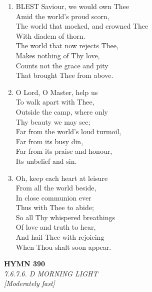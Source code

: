 \begin{enumerate}
    \item BLEST Saviour, we would own Thee \\
        Amid the world's proud scorn, \\
        The world that mocked, and crowned Thee \\
        With diadem of thorn. \\
        The world that now rejects Thee, \\
        Makes nothing of Thy love, \\
        Counts not the grace and pity \\
        That brought Thee from above.

    \item O Lord, O Master, help us \\
        To walk apart with Thee, \\
        Outside the camp, where only \\
        Thy beauty we may see; \\
        Far from the world's loud turmoil, \\
        Far from its busy din, \\
        Far from its praise and honour, \\
        Its unbelief and sin.

    \item Oh, keep each heart at leisure \\
        From all the world beside, \\
        In close communion ever \\
        Thus with Thee to abide; \\
        So all Thy whispered breathings \\
        Of love and truth to hear, \\
        And hail Thee with rejoicing \\
        When Thou shalt soon appear.

\end{enumerate}

\newpage
\begin{center}
    {\Large \textbf{HYMN 390}}
    \\
    \textit{7.6.7.6. D MORNING LIGHT}
    \\
    \textit{\small [Moderately fast]}
\end{center}
\vspace{1em}

